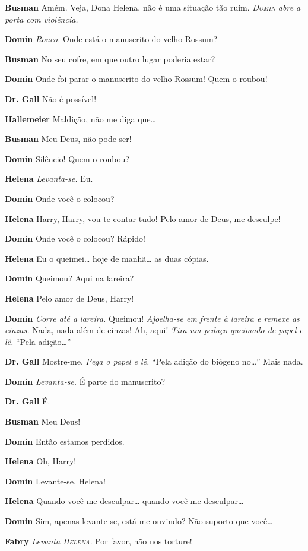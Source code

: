 \textbf{Busman} Amém. Veja, Dona Helena, não é uma situação tão ruim.
\emph{\textsc{Domin} abre a porta com violência.}

\textbf{Domin} \emph{Rouco.} Onde está o manuscrito do velho Rossum?

\textbf{Busman} No seu cofre, em que outro lugar poderia estar?

\textbf{Domin} Onde foi parar o manuscrito do velho Rossum! Quem o roubou!

\textbf{Dr. Gall} Não é possível!

\textbf{Hallemeier} Maldição, não me diga que\ldots{}

\textbf{Busman} Meu Deus, não pode ser!

\textbf{Domin} Silêncio! Quem o roubou?

\textbf{Helena} \emph{Levanta-se.} Eu.

\textbf{Domin} Onde você o colocou?

\textbf{Helena} Harry, Harry, vou te contar tudo! Pelo amor de Deus, me desculpe!

\textbf{Domin} Onde você o colocou? Rápido!

\textbf{Helena} Eu o queimei\ldots{} hoje de manhã\ldots{} as duas cópias.

\textbf{Domin} Queimou? Aqui na lareira?

\textbf{Helena} Pelo amor de Deus, Harry!

\textbf{Domin} \emph{Corre até a lareira.} Queimou! \emph{Ajoelha-se em frente à lareira e
remexe as cinzas.} Nada, nada além de cinzas! Ah, aqui! \emph{Tira um
pedaço queimado de papel e lê.} ``Pela adição\ldots{}''

\textbf{Dr. Gall} Mostre-me. \emph{Pega o papel e lê.} ``Pela adição do biógeno no\ldots{}'' Mais nada.

\textbf{Domin} \emph{Levanta-se.} É parte do manuscrito?

\textbf{Dr. Gall} É.

\textbf{Busman} Meu Deus!

\textbf{Domin} Então estamos perdidos.

\textbf{Helena} Oh, Harry!

\textbf{Domin} Levante-se, Helena!

\textbf{Helena} Quando você me desculpar\ldots{} quando você me desculpar\ldots{}

\textbf{Domin} Sim, apenas levante-se, está me ouvindo? Não suporto que você\ldots{}

\textbf{Fabry} \emph{Levanta \textsc{Helena}.} Por favor, não nos torture!

